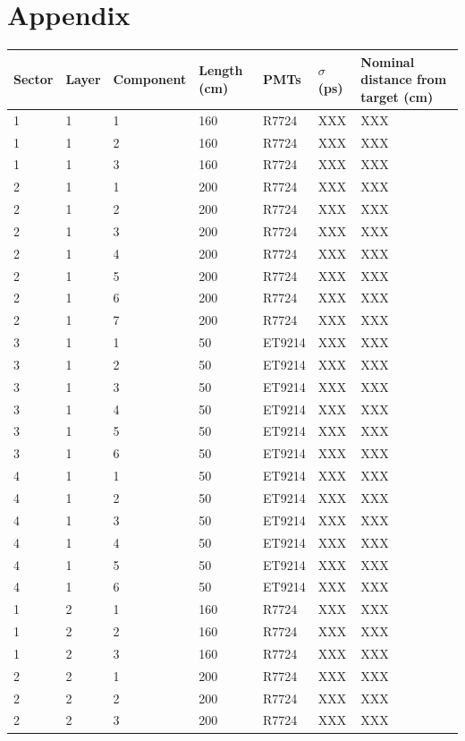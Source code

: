 \documentclass[3p,final,twocolumn]{elsarticle}
\begin{document}
{\section{Appendix}
\begin{table}[ht]
\begin{tabular}{  m{3em} | m{3em} | m{5em} | m{3em} | m{3em} | m{3em} | m{8em} }
		\hline
			Sector & Layer & Component & Length (\si{\centi\meter}) & PMTs  & $\sigma$ (\si{\pico\second}) & Nominal distance from target (\si{\centi\meter}) \\
		\hline
		\hline
1	&1	&1	&160	&R7724	&XXX	&XXX\\ 
1	&1	&2	&160	&R7724	&XXX	&XXX\\ 
1	&1	&3	&160	&R7724	&XXX	&XXX\\ 
2	&1	&1	&200	&R7724	&XXX	&XXX\\ 
2	&1	&2	&200	&R7724	&XXX	&XXX\\ 
2	&1	&3	&200	&R7724	&XXX	&XXX\\ 
2	&1	&4	&200	&R7724	&XXX	&XXX\\ 
2	&1	&5	&200	&R7724	&XXX	&XXX\\ 
2	&1	&6	&200	&R7724	&XXX	&XXX\\ 
2	&1	&7	&200	&R7724	&XXX	&XXX\\ 
3	&1	&1	&50	&ET9214	&XXX	&XXX\\ 
3	&1	&2	&50	&ET9214	&XXX	&XXX\\ 
3	&1	&3	&50	&ET9214	&XXX	&XXX\\ 
3	&1	&4	&50	&ET9214	&XXX	&XXX\\ 
3	&1	&5	&50	&ET9214	&XXX	&XXX\\ 
3	&1	&6	&50	&ET9214	&XXX	&XXX\\ 
4	&1	&1	&50	&ET9214	&XXX	&XXX\\ 
4	&1	&2	&50	&ET9214	&XXX	&XXX\\ 
4	&1	&3	&50	&ET9214	&XXX	&XXX\\ 
4	&1	&4	&50	&ET9214	&XXX	&XXX\\ 
4	&1	&5	&50	&ET9214	&XXX	&XXX\\ 
4	&1	&6	&50	&ET9214	&XXX	&XXX\\ 
1	&2	&1	&160	&R7724	&XXX	&XXX\\ 
1	&2	&2	&160	&R7724	&XXX	&XXX\\ 
1	&2	&3	&160	&R7724	&XXX	&XXX\\ 
2	&2	&1	&200	&R7724	&XXX	&XXX\\ 
2	&2	&2	&200	&R7724	&XXX	&XXX\\ 
2	&2	&3	&200	&R7724	&XXX	&XXX\\ 

\end{tabular}
\end{table}}
\end{document}

